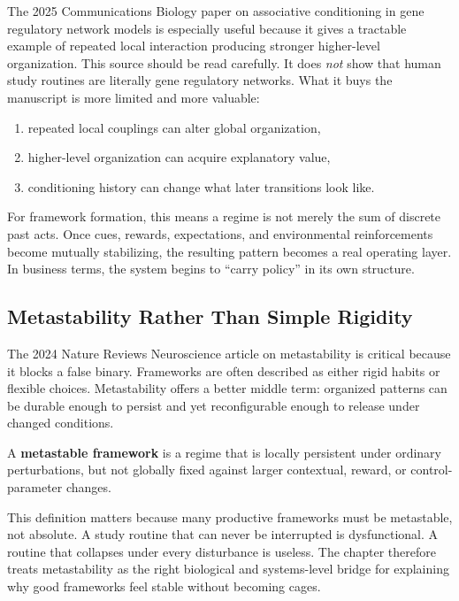 The 2025 Communications Biology paper on associative conditioning in gene
regulatory network models is especially useful because it gives a tractable
example of repeated local interaction producing stronger higher-level
organization. This source should be read carefully. It does \emph{not} show
that human study routines are literally gene regulatory networks. What it buys
the manuscript is more limited and more valuable:
\begin{enumerate}[nosep]
  \item repeated local couplings can alter global organization,
  \item higher-level organization can acquire explanatory value,
  \item conditioning history can change what later transitions look like.
\end{enumerate}

For framework formation, this means a regime is not merely the sum of discrete
past acts. Once cues, rewards, expectations, and environmental reinforcements
become mutually stabilizing, the resulting pattern becomes a real operating
layer. In business terms, the system begins to ``carry policy'' in its own
structure.

\subsection{Metastability Rather Than Simple Rigidity}

The 2024 Nature Reviews Neuroscience article on metastability is critical
because it blocks a false binary. Frameworks are often described as either
rigid habits or flexible choices. Metastability offers a better middle term:
organized patterns can be durable enough to persist and yet reconfigurable
enough to release under changed conditions.

\begin{definition}
A \textbf{metastable framework} is a regime that is locally persistent under
ordinary perturbations, but not globally fixed against larger contextual,
reward, or control-parameter changes.
\end{definition}

\begin{discussion}
This definition matters because many productive frameworks must be metastable,
not absolute. A study routine that can never be interrupted is dysfunctional.
A routine that collapses under every disturbance is useless. The chapter
therefore treats metastability as the right biological and systems-level bridge
for explaining why good frameworks feel stable without becoming cages.
\end{discussion}

